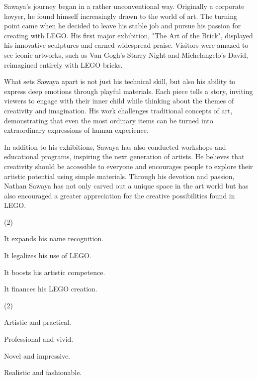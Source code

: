 \documentclass{英语试卷}
\begin{document}
\par Sawaya's journey began in a rather unconventional way. Originally a corporate lawyer, he found himself increasingly drawn to the world of art. The turning point came when he decided to leave his stable job and pursue his passion for creating with LEGO. His first major exhibition, "The Art of the Brick", displayed his innovative sculptures and earned widespread praise. Visitors were amazed to see iconic artworks, such as Van Gogh's Starry Night and Michelangelo's David, reimagined entirely with LEGO bricks.\par
\par What sets Sawaya apart is not just his technical skill, but also his ability to express deep emotions through playful materials. Each piece tells a story, inviting viewers to engage with their inner child while thinking about the themes of creativity and imagination. His work challenges traditional concepts of art, demonstrating that even the most ordinary items can be turned into extraordinary expressions of human experience.\par
\par In addition to his exhibitions, Sawaya has also conducted workshops and educational programs, inspiring the next generation of artists. He believes that creativity should be accessible to everyone and encourages people to explore their artistic potential using simple materials. Through his devotion and passion, Nathan Sawaya has not only carved out a unique space in the art world but has also encouraged a greater appreciation for the creative possibilities found in LEGO.\par
{}
\begin{choices}(2)
  \item It expands his name recognition.
  \item It legalizes his use of LEGO.
  \item It boosts his artistic competence.
  \item It finances his LEGO creation.
\end{choices}
\begin{choices}(2)
  \item Artistic and practical.
  \item Professional and vivid.
  \item Novel and impressive.
  \item Realistic and fashionable.
\end{choices}
\end{document}

